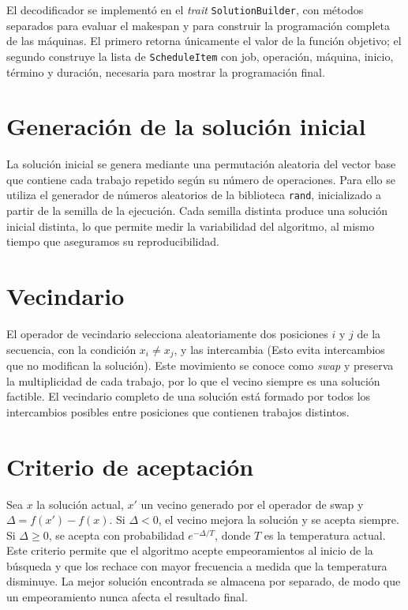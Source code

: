 El decodificador se implementó en el \emph{trait} \texttt{SolutionBuilder},
con métodos separados para evaluar el makespan y para construir la programación completa de las máquinas.
El primero retorna únicamente el valor de la función objetivo;
el segundo construye la lista de \texttt{ScheduleItem} con
job, operación, máquina, inicio, término y duración, necesaria para mostrar la programación final.

\section{Generación de la solución inicial}

La solución inicial se genera mediante una permutación aleatoria del vector base que
contiene cada trabajo repetido según su número de operaciones.
Para ello se utiliza el generador de números aleatorios de la biblioteca \texttt{rand},
inicializado a partir de la semilla de la ejecución.
Cada semilla distinta produce una solución inicial distinta, lo que permite medir la variabilidad
del algoritmo, al mismo tiempo que aseguramos su reproducibilidad.

\section{Vecindario}

El operador de vecindario selecciona aleatoriamente dos posiciones \(i\) y \(j\) de la secuencia,
con la condición \(x_i \neq x_j\), y las intercambia
(Esto evita intercambios que no modifican la solución).
Este movimiento se conoce como \emph{swap} y preserva la multiplicidad de cada trabajo,
por lo que el vecino siempre es una solución factible.
El vecindario completo de una solución está formado por todos los
intercambios posibles entre posiciones que contienen trabajos distintos.

\section{Criterio de aceptación}

Sea \(x\) la solución actual,
\(x'\) un vecino generado por el operador de swap y \(\Delta = f(x') - f(x)\).
Si \(\Delta < 0\), el vecino mejora la solución y se acepta siempre.
Si \(\Delta \ge 0\), se acepta con probabilidad \(e^{-\Delta/T}\),
donde \(T\) es la temperatura actual.
Este criterio permite que el algoritmo acepte empeoramientos al inicio de la búsqueda y
que los rechace con mayor frecuencia a medida que la temperatura disminuye.
La mejor solución encontrada se almacena por separado,
de modo que un empeoramiento nunca afecta el resultado final.

